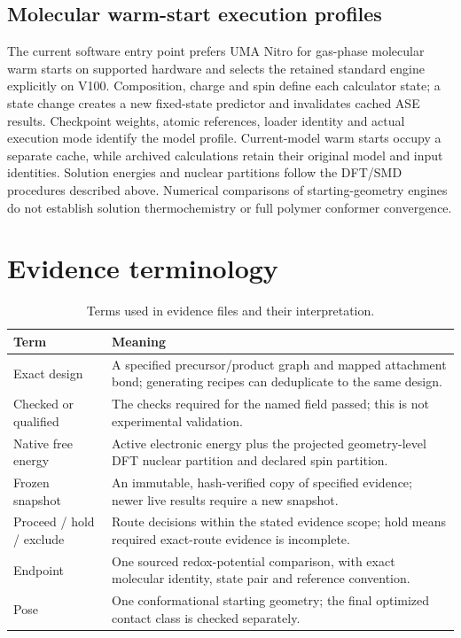 \documentclass[11pt]{article}
\begin{document}
\subsection{Molecular warm-start execution profiles}
The current software entry point prefers UMA Nitro for gas-phase molecular warm starts on supported hardware and selects the retained standard engine explicitly on V100.\cite{fairchemInference2026} Composition, charge and spin define each calculator state; a state change creates a new fixed-state predictor and invalidates cached ASE results. Checkpoint weights, atomic references, loader identity and actual execution mode identify the model profile. Current-model warm starts occupy a separate cache, while archived calculations retain their original model and input identities. Solution energies and nuclear partitions follow the DFT/SMD procedures described above. Numerical comparisons of starting-geometry engines do not establish solution thermochemistry or full polymer conformer convergence.

\section{Evidence terminology}
\begin{table}[H]\centering\small
\caption{Terms used in evidence files and their interpretation.}
\begin{tabular}{p{.24\linewidth}p{.67\linewidth}}\toprule
Term & Meaning\\\midrule
Exact design & A specified precursor/product graph and mapped attachment bond; generating recipes can deduplicate to the same design.\\
Checked or qualified & The checks required for the named field passed; this is not experimental validation.\\
Native free energy & Active electronic energy plus the projected geometry-level DFT nuclear partition and declared spin partition.\\
Frozen snapshot & An immutable, hash-verified copy of specified evidence; newer live results require a new snapshot.\\
Proceed / hold / exclude & Route decisions within the stated evidence scope; hold means required exact-route evidence is incomplete.\\
Endpoint & One sourced redox-potential comparison, with exact molecular identity, state pair and reference convention.\\
Pose & One conformational starting geometry; the final optimized contact class is checked separately.\\
\bottomrule\end{tabular}\end{table}

\end{document}

